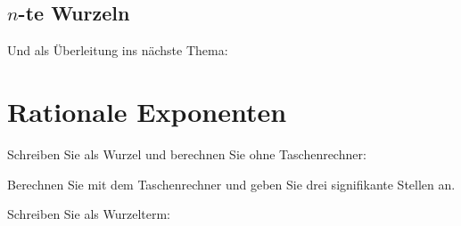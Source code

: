 

\newpage
\subsection{$n$-te Wurzeln}


\noTRAINER{\newpage}




\noTRAINER{\newpage}



\noTRAINER{\newpage}



\noTRAINER{\newpage}

\noTRAINER{\newpage}

Und als Überleitung ins nächste Thema:


\newpage
\section{Rationale Exponenten}

Schreiben Sie als Wurzel und berechnen Sie ohne Taschenrechner:


Berechnen Sie mit dem Taschenrechner und geben Sie drei signifikante
Stellen an.


\noTRAINER{\newpage}


Schreiben Sie als Wurzelterm:


